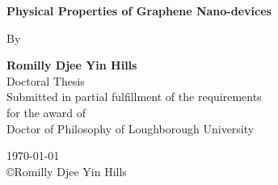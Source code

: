 \begin{titlepage}
	\begin{center}
		\large
		\vspace*{1cm}
        		
 		\textbf{Physical Properties of Graphene Nano-devices}
        
		\vspace{0.5cm}
		By
        
		\vspace{1.5cm}
        
		\textbf{Romilly Djee Yin Hills}\\
   		\vspace{0.5cm}
		Doctoral Thesis\\
		\vspace{0.5cm}
		Submitted in partial fulfillment of the requirements\\
		for the award of\\
		Doctor of Philosophy of Loughborough University

        
		\vspace{1.5cm}

		\today \\
		\copyright Romilly Djee Yin Hills\\
        
	\end{center}
\end{titlepage}